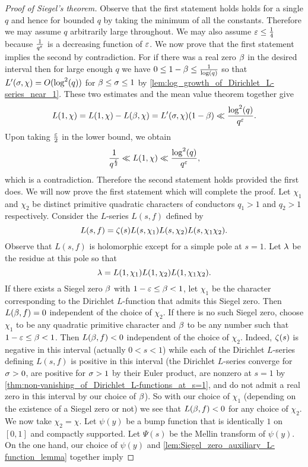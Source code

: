     \begin{proof}[Proof of Siegel's theorem]
      Observe that the first statement holds holds for a single $q$ and hence for bounded $q$ by taking the minimum of all the constants. Therefore we may assume $q$ arbitrarily large throughout. We may also assume $\varepsilon \le \frac{1}{4}$ because $\frac{1}{q^{\varepsilon}}$ is a decreasing function of $\varepsilon$. We now prove that the first statement implies the second by contradiction. For if there was a real zero $\beta$ in the desired interval then for large enough $q$ we have $0 \le 1-\beta \le \frac{1}{\log(q)}$ so that $L'(\sigma,\chi) = O(\log^{2}(q))$ for $\beta \le \sigma \le 1$ by \cref{lem:log_growth_of_Dirichlet_L-series_near_1}. These two estimates and the mean value theorem together give
      \[
        L(1,\chi) = L(1,\chi)-L(\beta,\chi) = L'(\sigma,\chi)(1-\beta) \ll \frac{\log^{2}(q)}{q^{\varepsilon}}.
      \]
      Upon taking $\frac{\varepsilon}{2}$ in the lower bound, we obtain
      \[
        \frac{1}{q^{\frac{\varepsilon}{2}}} \ll L(1,\chi) \ll \frac{\log^{2}(q)}{q^{\varepsilon}},
      \]
      which is a contradiction. Therefore the second statement holds provided the first does. We will now prove the first statement which will complete the proof. Let $\chi_{1}$ and $\chi_{2}$ be distinct primitive quadratic characters of conductors $q_{1} > 1$ and $q_{2} > 1$ respectively. Consider the $L$-series $L(s,f)$ defined by
      \[
        L(s,f) = \zeta(s)L(s,\chi_{1})L(s,\chi_{2})L(s,\chi_{1}\chi_{2}).
      \]
      Observe that $L(s,f)$ is holomorphic except for a simple pole at $s = 1$. Let $\lambda$ be the residue at this pole so that
      \[
        \lambda = L(1,\chi_{1})L(1,\chi_{2})L(1,\chi_{1}\chi_{2}).
      \]
      If there exists a Siegel zero $\beta$ with $1-\varepsilon \le \beta < 1$, let $\chi_{1}$ be the character corresponding to the Dirichlet $L$-function that admits this Siegel zero. Then $L(\beta,f) = 0$ independent of the choice of $\chi_{2}$. If there is no such Siegel zero, choose $\chi_{1}$ to be any quadratic primitive character and $\beta$ to be any number such that $1-\varepsilon \le \beta < 1$. Then $L(\beta,f) < 0$ independent of the choice of $\chi_{2}$. Indeed, $\zeta(s)$ is negative in this interval (actually $0 < s < 1$) while each of the Dirichlet $L$-series defining $L(s,f)$ is positive in this interval (the Dirichlet $L$-series converge for $\sigma > 0$, are positive for $\sigma > 1$ by their Euler product, are nonzero at $s = 1$ by \cref{thm:non-vanishing_of_Dirichlet_L-functions_at_s=1}, and do not admit a real zero in this interval by our choice of $\beta$). So with our choice of $\chi_{1}$ (depending on the existence of a Siegel zero or not) we see that $L(\beta,f) < 0$ for any choice of $\chi_{2}$. We now take $\chi_{2} = \chi$. Let $\psi(y)$ be a bump function that is identically $1$ on $[0,1]$ and compactly supported. Let $\Psi(s)$ be the Mellin transform of $\psi(y)$. On the one hand, our choice of $\psi(y)$ and \cref{lem:Siegel_zero_auxiliary_L-function_lemma} together imply

\end{proof}
